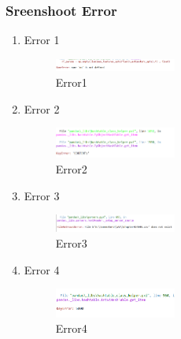         \subsubsection{Sreenshoot Error}
        \begin{enumerate}
            \item Error 1
            \begin{figure}[H]
                \includegraphics[width=4cm]{figures/1174040/chapter4/errtype1.png}
                \centering
                \caption{Error1}
            \end{figure}
            \item Error 2
            \begin{figure}[H]
                \includegraphics[width=4cm]{figures/1174040/chapter4/errtype2.png}
                \centering
                \caption{Error2}
            \end{figure}
            \item Error 3
            \begin{figure}[H]
                \includegraphics[width=4cm]{figures/1174040/chapter4/errtype3.png}
                \centering
                \caption{Error3}
            \end{figure}
            \item Error 4
            \begin{figure}[H]
                \includegraphics[width=4cm]{figures/1174040/chapter4/errtype4.png}
                \centering
                \caption{Error4}
            \end{figure}
        \end{enumerate}
